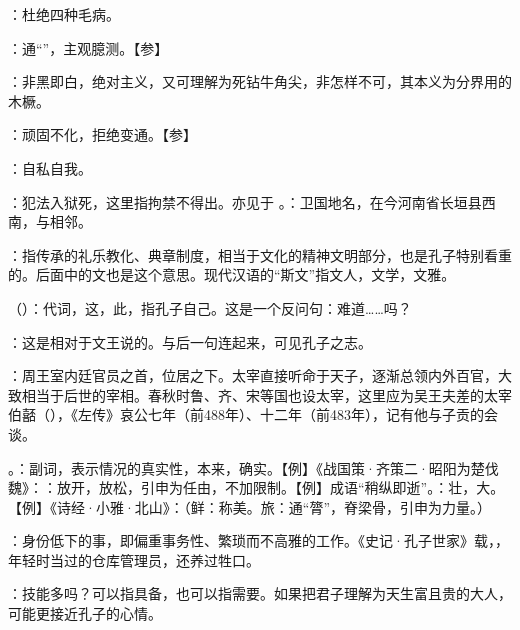 {
\item {}：杜绝四种毛病。
\item {}：通“”，主观臆测。【参】
\item {}：非黑即白，绝对主义，又可理解为死钻牛角尖，非怎样不可，其本义为分界用的木橛。%
\item {}：顽固不化，拒绝变通。【参】
\item {}：自私自我。
}
{}


{
\item {}：犯法入狱死，这里指拘禁不得出。亦见于 。：卫国地名，在今河南省长垣县西南，与相邻。%
\item {}：指传承的礼乐教化、典章制度，相当于文化的精神文明部分，也是孔子特别看重的。后面中的文也是这个意思。现代汉语的“斯文”指文人，文学，文雅。
\item {}（）：代词，这，此，指孔子自己。这是一个反问句：难道……吗？
\item {}：这是相对于文王说的。与后一句连起来，可见孔子之志。
}
{}


{
\item {}：周王室内廷官员之首，位居之下。太宰直接听命于天子，逐渐总领内外百官，大致相当于后世的宰相。春秋时鲁、齐、宋等国也设太宰，这里应为吴王夫差的太宰伯嚭（），《左传》哀公七年（前488年）、十二年（前483年），记有他与子贡的会谈。
\item {}。：副词，表示情况的真实性，本来，确实。【例】《战国策·齐策二·昭阳为楚伐魏》：：放开，放松，引申为任由，不加限制。【例】成语“稍纵即逝”。：壮，大。【例】《诗经·小雅·北山》：（鲜：称美。旅：通“膂”，脊梁骨，引申为力量。）
\item {}：身份低下的事，即偏重事务性、繁琐而不高雅的工作。《史记·孔子世家》载，，年轻时当过的仓库管理员，还养过牲口。
\item {}：技能多吗？可以指具备，也可以指需要。如果把君子理解为天生富且贵的大人，可能更接近孔子的心情。
}
{}


